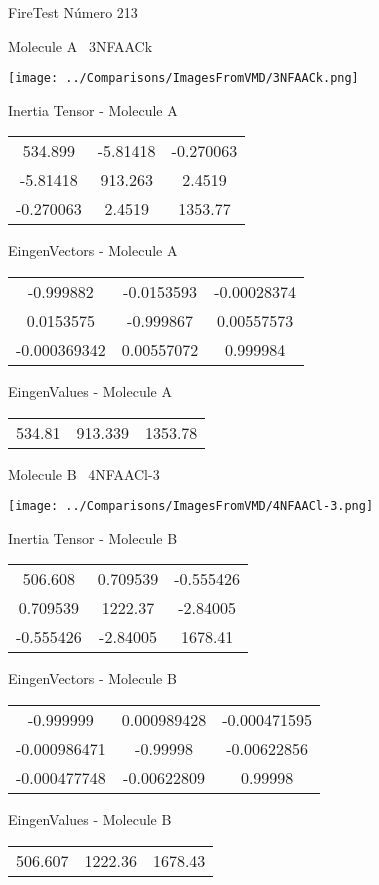 \vtab[-3cm]
\begin{center}
{\large FireTest \tab Número 213}
\end{center}
\begin{multicols}{2}
\begin{center}

Molecule A \
3NFAACk

\texttt{[image: ../Comparisons/ImagesFromVMD/3NFAACk.png]}

Inertia Tensor - Molecule A \\
\begin{tabular}{|c c c|}
534.899	 & 	-5.81418	 & 	-0.270063	 \\
-5.81418	 & 	913.263	 & 	2.4519	 \\
-0.270063	 & 	2.4519	 & 	1353.77
\end{tabular}

\vtab
 EingenVectors - Molecule A     \\
\begin{tabular}{|c c c|}
-0.999882	 & 	-0.0153593	 & 	-0.00028374	 \\
0.0153575	 & 	-0.999867	 & 	0.00557573	 \\
-0.000369342	 & 	0.00557072	 & 	0.999984
\end{tabular}

\vtab
 EingenValues - Molecule A     \\
\begin{tabular}{|c c c|}
534.81	 & 	913.339	 & 	1353.78	 \\
\end{tabular}
\columnbreak

Molecule B \
4NFAACl-3

\texttt{[image: ../Comparisons/ImagesFromVMD/4NFAACl-3.png]}

Inertia Tensor - Molecule B \\
\begin{tabular}{|c c c|}
506.608	 & 	0.709539	 & 	-0.555426	 \\
0.709539	 & 	1222.37	 & 	-2.84005	 \\
-0.555426	 & 	-2.84005	 & 	1678.41
\end{tabular}

\vtab
 EingenVectors - Molecule B     \\
\begin{tabular}{|c c c|}
-0.999999	 & 	0.000989428	 & 	-0.000471595	 \\
-0.000986471	 & 	-0.99998	 & 	-0.00622856	 \\
-0.000477748	 & 	-0.00622809	 & 	0.99998
\end{tabular}

\vtab
 EingenValues - Molecule B     \\
\begin{tabular}{|c c c|}
506.607	 & 	1222.36	 & 	1678.43	 \\
\end{tabular}

\end{center}
\end{multicols}

